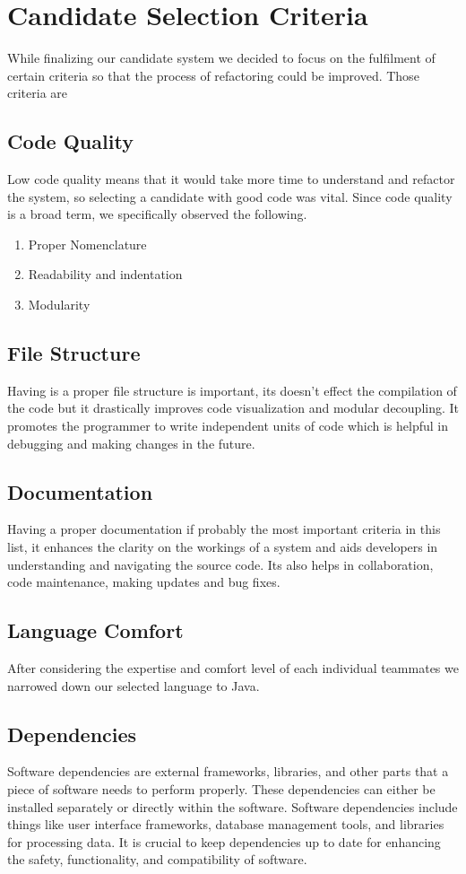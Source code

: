 \documentclass[12pt,english]{article}
\begin{document}

\section{Candidate Selection Criteria}
While finalizing our candidate system we decided to focus on the fulfilment of certain criteria so that the process of refactoring could be improved. Those criteria are 
    \subsection{Code Quality}
    Low code quality means that it would take more time to understand and refactor the system, so selecting a candidate with good code was vital. Since code quality is a broad term, we specifically observed the following. 
        \begin{enumerate}
            \item Proper Nomenclature
            \item Readability and indentation
            \item Modularity
        \end{enumerate}
    \subsection{File Structure}
    Having is a proper file structure is important, its doesn't effect the compilation of the code but it drastically improves code visualization and modular decoupling. It promotes the programmer to write independent units of code which is helpful in debugging and making changes in the future. 
    \subsection{Documentation}
    Having a proper documentation if probably the most important criteria in this list, it enhances the clarity on the workings of a system and aids developers in understanding and navigating the source code. Its also helps in collaboration, code maintenance, making updates and bug fixes. 
    \subsection{Language Comfort}
    After considering the expertise and comfort level of each individual teammates we narrowed down our selected language to Java. 
    \subsection{Dependencies}
    Software dependencies are external frameworks, libraries, and other parts that a piece of software needs to perform properly. These dependencies can either be installed separately or directly within the software. Software dependencies include things like user interface frameworks, database management tools, and libraries for processing data. It is crucial to keep dependencies up to date for enhancing the safety, functionality, and compatibility of software.
\end{document}
